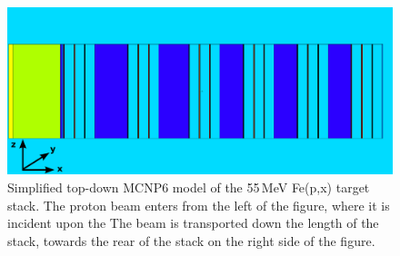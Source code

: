 \begin{figure}
 \centering
 \includegraphics[trim = 0mm 0mm 2mm 0mm, clip,width=0.75\columnwidth]{./figures/ipf_stack_nolabels_axes.PNG}
 \caption{ Simplified top-down MCNP6 model of the 55\,MeV Fe(p,x) target stack. The  proton beam enters from the left of the figure, where it is incident upon the  The beam is transported down the length of the stack, towards the rear of the stack on the right side of the figure.
}
 \label{fig:fe_vised_55}
\end{figure}


